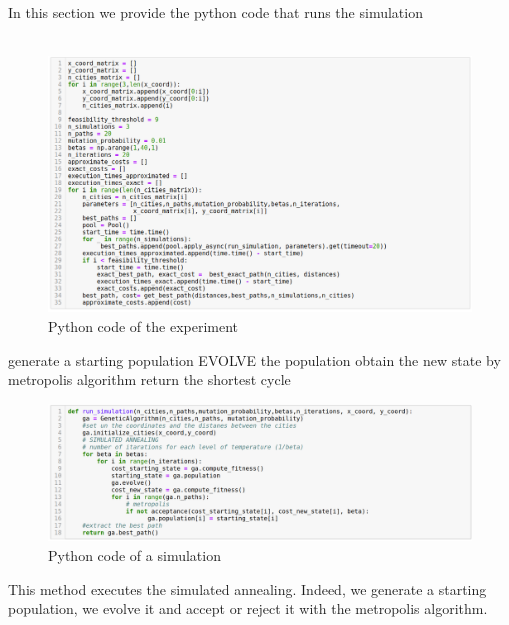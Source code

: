 \documentclass{article}
\begin{document}
\noindent In this section we provide the python code that runs the simulation\\
\\
\begin{figure}[H]
\includegraphics[scale=0.5]{simulation.png} 
\centering
\caption{Python code of the experiment}
\end{figure}

\begin{algorithm}[H]
    \begin{algorithmic}[1]
      \State generate a starting population
       		\State EVOLVE the population
       		\State obtain the new state by metropolis algorithm
       	\EndFor 
       \EndFor
       \State return the shortest cycle
       \EndFunction
\end{algorithmic}
\end{algorithm}



\begin{figure}[H]
\includegraphics[scale=0.38]{run_simulation.png} 
\centering
\caption{Python code of a simulation}
\end{figure}
\noindent This method executes the simulated annealing. Indeed, we generate a starting population, we evolve it and accept or reject it with the metropolis algorithm.
\end{document}

